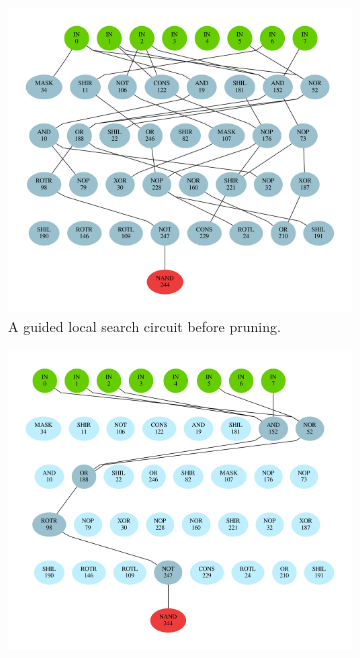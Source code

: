 \documentclass[
    digital,    %
    oneside,    %
    color,
    11pt,
    nocover,
    notable,
    nolof,
    nolot,
]{fithesis3}
\begin{document}
\begin{figure}
\begin{nomar}
\begin{subfigure}{.65\textwidth}
  \centering
  \includegraphics[width=\textwidth]{./graphics/gls/circuit}
  \caption{A guided local search circuit before pruning.}
  \label{fig:gls-circuit-unpruned}
\end{subfigure}%
\begin{subfigure}{.65\textwidth}
  \centering
  \includegraphics[width=\textwidth]{./graphics/gls/pruned}

\end{subfigure}
\end{nomar}
\end{figure}
\end{document}
